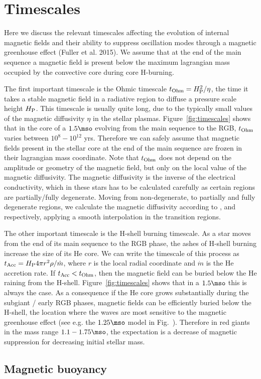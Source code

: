\section{Timescales}
\label{time}
Here we discuss the relevant timescales affecting the evolution of internal magnetic fields and their ability to 
suppress oscillation modes through a magnetic greenhouse effect (Fuller et al. 2015).
We assume that at the end of the main sequence a magnetic field is present below the maximum lagrangian mass occupied by the convective core during core H-burning.

The first important timescale is the Ohmic timescale $t_{\rm Ohm}= H_{\rm P}^2/\eta$, the time it takes a stable magnetic field in a radiative region to diffuse a pressure scale height $H_{\rm P}$. This timescale is usually quite long, due to the typically  small values of the magnetic diffusivity $\eta$ in the stellar plasmas. Figure~\ref{fig:timescales} shows that in the core of a $1.5\mso$ evolving from the main sequence to the RGB,  $t_{\rm Ohm}$ varies between $10^8-10^{12}$ yrs. Therefore we can safely assume that magnetic fields present in the stellar core at the end of the main sequence are frozen in their lagrangian mass coordinate.
Note that  $t_{\rm Ohm}$ does not depend on the amplitude or geometry of the magnetic field, but only on the local value of the magnetic diffusivity. The magnetic diffusivity is the inverse of the electrical conductivity,  which in these stars has to be calculated carefully as certain regions are partially/fully degenerate. Moving from non-degenerate, to partially and fully degenerate regions, we calculate the magnetic diffusivity according to ,  and  respectively, applying a smooth interpolation in the transition regions.

The other important timescale is the H-shell burning timescale. As a star moves from the end of its main sequence to the RGB phase, the ashes of H-shell burning increase the size of its He core. We can write the timescale of this process as $t_{\rm Acc} = H_{\rm P} 4\pi r^2 \rho / \dot{m}$, where $r$ is the local radial coordinate and $\dot{m}$ is the He accretion rate. If $t_{\rm Acc} < t_{\rm Ohm}$, then the magnetic field can be buried below the He raining from the H-shell. Figure~\ref{fig:timescales} shows that in a $1.5\mso$ this is always the case. As a consequence if the He core grows substantially during the subgiant / early RGB phases, magnetic fields can be efficiently buried below the H-shell, the location where the waves are most sensitive to the magnetic greenhouse effect (see e.g. the $1.25\mso$ model in Fig.~\label{fig:DipoleHist}). Therefore in red giants in the mass range $1.1-1.75\mso$, the expectation is a decrease of magnetic suppression for decreasing initial stellar mass.

\subsection{Magnetic buoyancy}
